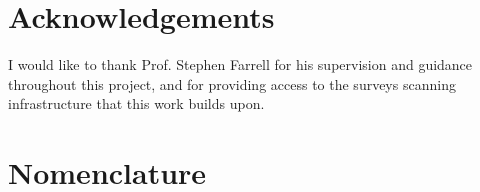 
\newpage
\raggedright

\section*{\Huge{Acknowledgements}}
I would like to thank Prof. Stephen Farrell for his supervision and guidance throughout this project, and for providing access to the surveys scanning infrastructure that this work builds upon.

\newpage \tableofcontents
\newpage \listoffigures
\newpage \listoftables
\newpage
\section*{\Huge{Nomenclature}}

\mainmatter








\appendix
\renewcommand{\thechapter}{A\arabic{chapter}}



